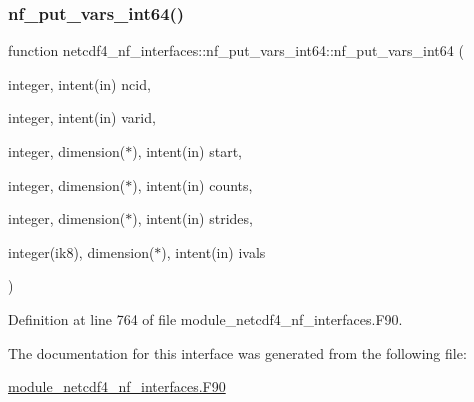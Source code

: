 \subsubsection{\texorpdfstring{nf\+\_\+put\+\_\+vars\+\_\+int64()}{nf\_put\_vars\_int64()}}
{\footnotesize\ttfamily function netcdf4\+\_\+nf\+\_\+interfaces\+::nf\+\_\+put\+\_\+vars\+\_\+int64\+::nf\+\_\+put\+\_\+vars\+\_\+int64 (\begin{DoxyParamCaption}\item[{integer, intent(in)}]{ncid,  }\item[{integer, intent(in)}]{varid,  }\item[{integer, dimension($\ast$), intent(in)}]{start,  }\item[{integer, dimension($\ast$), intent(in)}]{counts,  }\item[{integer, dimension($\ast$), intent(in)}]{strides,  }\item[{integer(ik8), dimension($\ast$), intent(in)}]{ivals }\end{DoxyParamCaption})}



Definition at line 764 of file module\+\_\+netcdf4\+\_\+nf\+\_\+interfaces.\+F90.



The documentation for this interface was generated from the following file\+:\begin{DoxyCompactItemize}
\item 
\hyperlink{module__netcdf4__nf__interfaces_8F90}{module\+\_\+netcdf4\+\_\+nf\+\_\+interfaces.\+F90}\end{DoxyCompactItemize}

